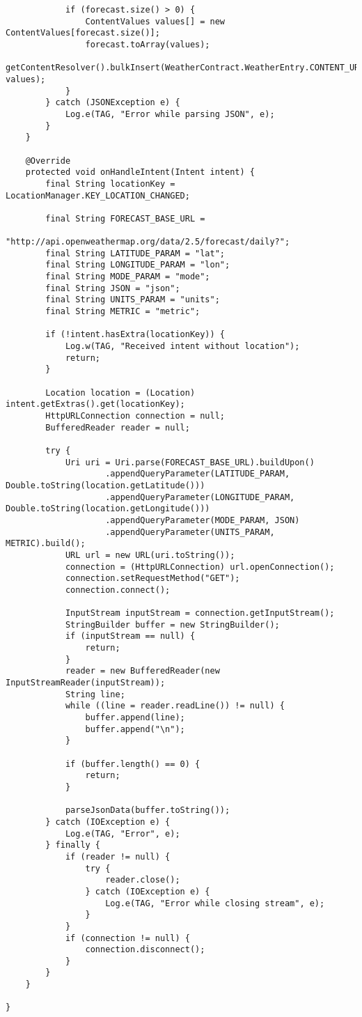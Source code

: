 \documentclass[12 pt]{article}
\begin{document}
\begin{lstlisting}
            if (forecast.size() > 0) {
                ContentValues values[] = new ContentValues[forecast.size()];
                forecast.toArray(values);
                getContentResolver().bulkInsert(WeatherContract.WeatherEntry.CONTENT_URI, values);
            }
        } catch (JSONException e) {
            Log.e(TAG, "Error while parsing JSON", e);
        }
    }

    @Override
    protected void onHandleIntent(Intent intent) {
        final String locationKey = LocationManager.KEY_LOCATION_CHANGED;

        final String FORECAST_BASE_URL =
                "http://api.openweathermap.org/data/2.5/forecast/daily?";
        final String LATITUDE_PARAM = "lat";
        final String LONGITUDE_PARAM = "lon";
        final String MODE_PARAM = "mode";
        final String JSON = "json";
        final String UNITS_PARAM = "units";
        final String METRIC = "metric";

        if (!intent.hasExtra(locationKey)) {
            Log.w(TAG, "Received intent without location");
            return;
        }

        Location location = (Location) intent.getExtras().get(locationKey);
        HttpURLConnection connection = null;
        BufferedReader reader = null;

        try {
            Uri uri = Uri.parse(FORECAST_BASE_URL).buildUpon()
                    .appendQueryParameter(LATITUDE_PARAM, Double.toString(location.getLatitude()))
                    .appendQueryParameter(LONGITUDE_PARAM, Double.toString(location.getLongitude()))
                    .appendQueryParameter(MODE_PARAM, JSON)
                    .appendQueryParameter(UNITS_PARAM, METRIC).build();
            URL url = new URL(uri.toString());
            connection = (HttpURLConnection) url.openConnection();
            connection.setRequestMethod("GET");
            connection.connect();

            InputStream inputStream = connection.getInputStream();
            StringBuilder buffer = new StringBuilder();
            if (inputStream == null) {
                return;
            }
            reader = new BufferedReader(new InputStreamReader(inputStream));
            String line;
            while ((line = reader.readLine()) != null) {
                buffer.append(line);
                buffer.append("\n");
            }

            if (buffer.length() == 0) {
                return;
            }

            parseJsonData(buffer.toString());
        } catch (IOException e) {
            Log.e(TAG, "Error", e);
        } finally {
            if (reader != null) {
                try {
                    reader.close();
                } catch (IOException e) {
                    Log.e(TAG, "Error while closing stream", e);
                }
            }
            if (connection != null) {
                connection.disconnect();
            }
        }
    }

}
    \end{lstlisting}
    
\end{document}
